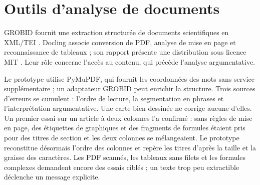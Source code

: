 \section{Outils d'analyse de documents}
GROBID fournit une extraction structurée de documents scientifiques en XML/TEI \cite{ref22}. Docling associe conversion de PDF, analyse de mise en page et reconnaissance de tableaux ; son rapport présente une distribution sous licence MIT \cite{ref23}. Leur rôle concerne l'accès au contenu, qui précède l'analyse argumentative.

Le prototype utilise PyMuPDF, qui fournit les coordonnées des mots sans service supplémentaire ; un adaptateur GROBID peut enrichir la structure. Trois sources d'erreurs se cumulent : l'ordre de lecture, la segmentation en phrases et l'interprétation argumentative. Une carte bien dessinée ne corrige aucune d'elles. Un premier essai sur un article à deux colonnes l'a confirmé : sans règles de mise en page, des étiquettes de graphiques et des fragments de formules étaient pris pour des titres de section et les deux colonnes se mélangeaient. Le prototype reconstitue désormais l'ordre des colonnes et repère les titres d'après la taille et la graisse des caractères. Les PDF scannés, les tableaux sans filets et les formules complexes demandent encore des essais ciblés ; un texte trop peu extractible déclenche un message explicite.
